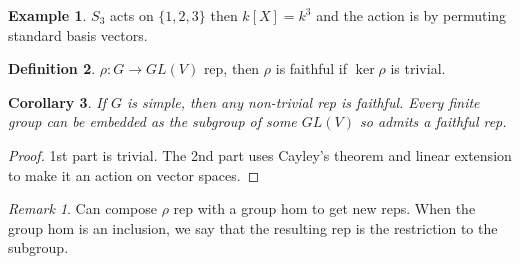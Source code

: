 \documentclass{article}
\theoremstyle{definition}
\newtheorem{defn}{Definition}[section]
\newtheorem{example}[defn]{Example}
\theoremstyle{remark}
\newtheorem{rem}{Remark}
\theoremstyle{plain}
\newtheorem{crly}[defn]{Corollary}
\begin{document}
\begin{example}
    $S_3$ acts on $\{1,2,3\}$ then $k[X]=k^3$ and the action is by permuting standard basis vectors.
\end{example}
\begin{defn}
    $\rho:G\to GL(V)$ rep, then $\rho$ is faithful if $\ker\rho$ is trivial.
\end{defn}
\begin{crly}
    If $G$ is simple, then any non-trivial rep is faithful. Every finite group can be embedded as the subgroup of some $GL(V)$ so admits a faithful rep.
\end{crly}
\begin{proof}
    1st part is trivial. The 2nd part uses Cayley's theorem and linear extension to make it an action on vector spaces.
\end{proof}
\begin{rem}
    Can compose $\rho$ rep with a group hom to get new reps. When the group hom is an inclusion, we say that the resulting rep is the restriction to the subgroup.
\end{rem}
\end{document}
